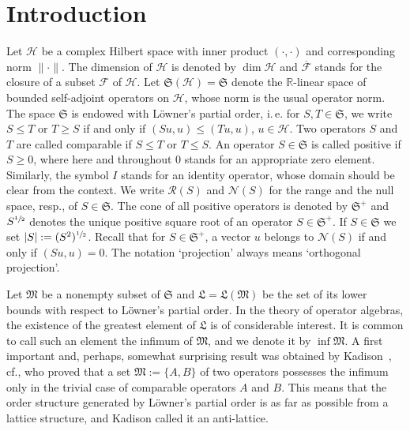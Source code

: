 \documentclass[12pt, a4paper, reqno, twoside]{amsart}
\numberwithin{equation}{section}
\newcommand{\frakS}{\mathfrak S}
\newcommand{\frakL}{\mathfrak L}
\newcommand{\frakM}{\mathfrak M}
\newcommand{\scrH}{\mathscr H}
\newcommand{\scrF}{\mathscr F}
\newcommand{\ie}{\mbox{i.\,e.}\xspace}
\newcommand{\cf}{\mbox{cf.}\xspace}
\theoremstyle{definition}
\theoremstyle{remark}
\theoremstyle{mystyle}
\begin{document}
\maketitle

\thispagestyle{empty} 



\section{Introduction}
\label{sec1}
Let $\scrH$ be a complex Hilbert space with inner product
$(\cdot,\cdot)$ and corresponding norm $\|\cdot\|$. The dimension of
$\scrH$ is denoted by $\dim\scrH$ and $\overline{\scrF}$ stands for the
closure of a subset $\scrF$ of $\scrH$. Let $\frakS(\scrH) = \frakS$
denote the $\mathbb R$-linear space of bounded self-adjoint operators
on $\scrH$, whose norm is the usual operator norm. The space $\frakS$
is endowed with L\"owner's partial order, \ie for $S,T\in\frakS$, we
write $S\leq T$ or $T\geq S$ if and only if $(Su,u)\leq(Tu,u)$, $u\in
\scrH$. Two operators $S$ and $T$ are called comparable if $S\leq T$
or $T\leq S$. An operator $S\in\frakS$ is called positive if $S\geq
0$,  where here and throughout $0$ stands for an appropriate zero
element.  Similarly, the symbol $I$ stands for an identity operator,
whose  domain should be clear from the context. We write $\mathscr
R(S)$  and $\mathscr N(S)$ for the range and the null space, resp., of
$S\in\frakS$. The cone of all positive operators is denoted by
$\frakS^{+}$  and $S^{\sfrac{1}{2}}$ denotes the unique positive
square root of an operator $S\in\frakS^{+}$. If $S\in\frakS$ we set
$|S|:=(S^{2})^{\sfrac{1}{2}}$. Recall that for $S\in\frakS^{+}$, a
vector $u$ belongs to $\mathscr N(S)$ if and only if $(Su,u)=0$.
The notation `projection' always means `orthogonal projection'.

Let $\frakM$ be a nonempty subset of $\frakS$ and
$\frakL=\frakL(\frakM)$ be the set of its lower bounds with respect to
L\"owner's partial order. In the theory of operator algebras, the
existence of the greatest element of $\frakL$ is of considerable interest.
It is common to call such an element the infimum of $\frakM$, and we
denote it by $\inf\frakM$. A first important and, perhaps, somewhat
surprising result was obtained by Kadison~\cite{Kadison1951},
\cf \cite[Exercise~2.8.18]{KadisonRingrose1983}, who proved that a
set  $\frakM:=\{A,B\}$ of two operators possesses the infimum only in the
trivial case of comparable operators $A$ and $B$. This means that the
order structure generated by L\"owner's partial order is as far as
possible from a lattice structure, and Kadison called it an anti-lattice.
\end{document}
